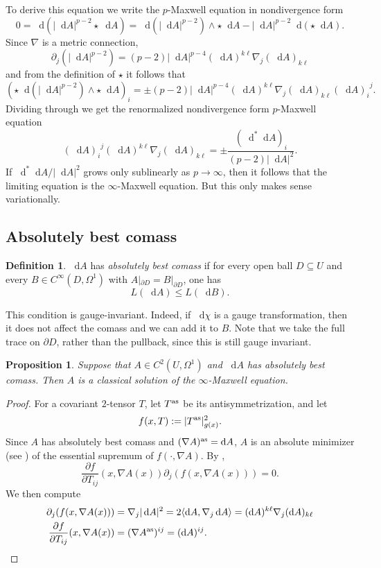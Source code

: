 \documentclass[reqno,11pt]{amsart}
\newcommand*\dif{\mathop{}\!\mathrm{d}}
\newcommand{\dfn}[1]{\emph{#1}\index{#1}}
\newtheorem{proposition}[theorem]{Proposition}
\theoremstyle{definition}
\newtheorem{definition}[theorem]{Definition}
\numberwithin{equation}{section}
\begin{document}
To derive this equation we write the $p$-Maxwell equation in nondivergence form
$$0 = \dif(|\dif A|^{p - 2} \star \dif A) = \dif(|\dif A|^{p - 2}) \wedge \star \dif A - |\dif A|^{p - 2} \dif(\star \dif A).$$
Since $\nabla$ is a metric connection,
$$\partial_j (|\dif A|^{p - 2}) = (p - 2) |\dif A|^{p - 4} (\dif A)^{k \ell} \nabla_j (\dif A)_{k \ell}$$
and from the definition of $\star$ it follows that
$$(\star \dif(|\dif A|^{p - 2}) \wedge \star \dif A)_i = \pm (p - 2) |\dif A|^{p - 4} (\dif A)^{k \ell} \nabla_j (\dif A)_{k \ell} {(\dif A)_i}^j.$$
Dividing through we get the renormalized nondivergence form $p$-Maxwell equation 
$${(\dif A)_i}^j (\dif A)^{k\ell} \nabla_j (\dif A)_{k \ell} = \pm \frac{(\dif^* \dif A)_i}{(p - 2) |\dif A|^2}.$$
If $\dif^* \dif A/|\dif A|^2$ grows only sublinearly as $p \to \infty$, then it follows that the limiting equation is the $\infty$-Maxwell equation.
But this only makes sense variationally.

\subsection{Absolutely best comass}
\begin{definition}
$\dif A$ has \dfn{absolutely best comass} if for every open ball $D \subseteq U$ and every $B \in C^\infty(D, \Omega^1)$ with $A|_{\partial D} = B|_{\partial D}$,
one has
$$L(\dif A) \leq L(\dif B).$$
\end{definition}

This condition is gauge-invariant.
Indeed, if $\dif \chi$ is a gauge transformation, then it does not affect the comass and we can add it to $B$.
Note that we take the full trace on $\partial D$, rather than the pullback, since this is still gauge invariant.

\begin{proposition}
Suppose that $A \in C^2(U, \Omega^1)$ and $\dif A$ has absolutely best comass.
Then $A$ is a classical solution of the $\infty$-Maxwell equation.
\end{proposition}
\begin{proof}
For a covariant $2$-tensor $T$, let $T^{\rm as}$ be its antisymmetrization, and let
$$f(x, T) := |T^{\rm as}|_{g(x)}^2.$$
Since $A$ has absolutely best comass and $(\nabla A)^{\rm as} = \dif A$, $A$ is an absolute minimizer (see \cite[Definition 5.1]{Barron2001}) of the essential supremum of $f(\cdot, \nabla A)$.
By \cite[Theorem 5.2]{Barron2001},
\begin{equation}\label{ELA}
	\frac{\partial f}{\partial T_{ij}}(x, \nabla A(x)) \partial_j (f(x, \nabla A(x))) = 0.
\end{equation}
We then compute
\begin{align*}
\partial_j (f(x, \nabla A(x))) &= \nabla_j |\dif A|^2 = 2 \langle \dif A, \nabla_j \dif A\rangle = (\dif A)^{k\ell} \nabla_j (\dif A)_{k\ell} \\
\frac{\partial f}{\partial T_{ij}}(x, \nabla A(x)) &= (\nabla A^{\rm as})^{ij} = (\dif A)^{ij}. \qedhere
\end{align*}
\end{proof}
\end{document}
